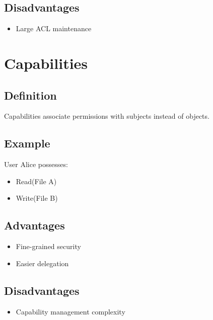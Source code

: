 \subsection{Disadvantages}

\begin{itemize}
\item Large ACL maintenance
\end{itemize}

\section{Capabilities}

\subsection{Definition}

Capabilities associate permissions with subjects instead of objects.

\subsection{Example}

User Alice possesses:

\begin{itemize}
\item Read(File A)
\item Write(File B)
\end{itemize}

\subsection{Advantages}

\begin{itemize}
\item Fine-grained security
\item Easier delegation
\end{itemize}

\subsection{Disadvantages}

\begin{itemize}
\item Capability management complexity
\end{itemize}

